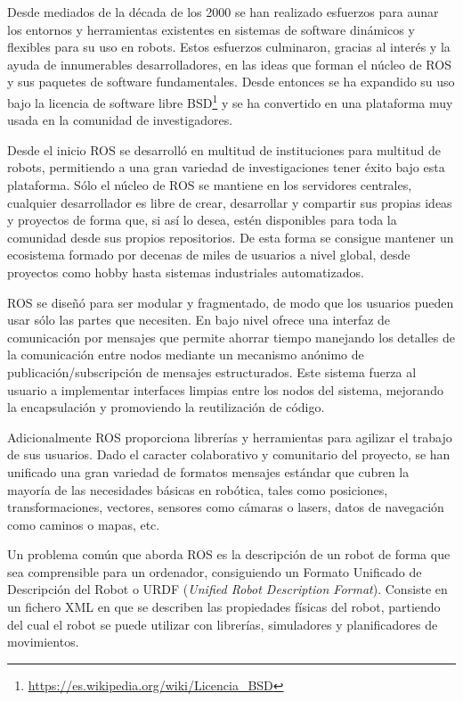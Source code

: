 Desde mediados de la década de los 2000 se han realizado esfuerzos para aunar los entornos y herramientas existentes en sistemas de software dinámicos y flexibles para su uso en robots. Estos esfuerzos culminaron, gracias al interés y la ayuda de innumerables desarrolladores, en las ideas que forman el núcleo de ROS y sus paquetes de software fundamentales. Desde entonces se ha expandido su uso bajo la licencia de software libre BSD\footnote{\url{https://es.wikipedia.org/wiki/Licencia_BSD}} y se ha convertido en una plataforma muy usada en la comunidad de investigadores.

Desde el inicio ROS se desarrolló en multitud de instituciones para multitud de robots, permitiendo a una gran variedad de investigaciones tener éxito bajo esta plataforma. Sólo el núcleo de ROS se mantiene en los servidores centrales, cualquier desarrollador es libre de crear, desarrollar y compartir sus propias ideas y proyectos de forma que, si así lo desea, estén disponibles para toda la comunidad desde sus propios repositorios. De esta forma se consigue mantener un ecosistema formado por decenas de miles de usuarios a nivel global, desde proyectos como hobby hasta sistemas industriales automatizados.

ROS se diseñó para ser modular y fragmentado, de modo que los usuarios pueden usar sólo las partes que necesiten. En bajo nivel ofrece una interfaz de comunicación por mensajes que permite ahorrar tiempo manejando los detalles de la comunicación entre nodos mediante un mecanismo anónimo de publicación/subscripción de mensajes estructurados. Este sistema fuerza al usuario a implementar interfaces limpias entre los nodos del sistema, mejorando la encapsulación y promoviendo la reutilización de código.

Adicionalmente ROS proporciona librerías y herramientas para agilizar el trabajo de sus usuarios. Dado el caracter colaborativo y comunitario del proyecto, se han unificado una gran variedad de formatos mensajes estándar que cubren la mayoría de las necesidades básicas en robótica, tales como posiciones, transformaciones, vectores, sensores como cámaras o lasers, datos de navegación como caminos o mapas, etc. 

Un problema común que aborda ROS es la descripción de un robot de forma que sea comprensible para un ordenador, consiguiendo un Formato Unificado de Descripción del Robot o URDF (\textit{Unified Robot Description Format}). Consiste en un fichero XML en que se describen las propiedades físicas del robot, partiendo del cual el robot se puede utilizar con librerías, simuladores y planificadores de movimientos.

